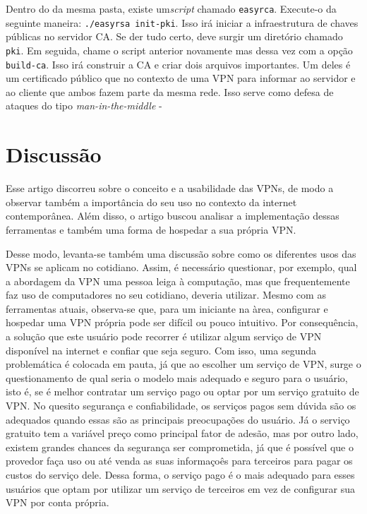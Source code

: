\documentclass[12pt]{article}
\begin{document}
\begin{flushleft}
Dentro do da mesma pasta, existe um\emph{script} chamado \texttt{easyrca}. Execute-o da seguinte
maneira: \texttt{./easyrsa init-pki}. Isso irá iniciar a infraestrutura de chaves públicas no servidor CA.
Se der tudo certo, deve surgir um diretório chamado \texttt{pki}. Em seguida, chame o script anterior 
novamente mas dessa vez com a opção \texttt{build-ca}. Isso irá construir a CA e criar
dois arquivos importantes. Um deles é um certificado público que no contexto de uma VPN para informar
ao servidor e ao cliente que ambos fazem parte da mesma rede. Isso serve como defesa de ataques 
do tipo \emph{man-in-the-middle} 
-

\section{Discussão}

Esse artigo discorreu sobre o conceito e a usabilidade das VPNs, de modo a observar também a importância
do seu uso no contexto da internet contemporânea. Além disso, o artigo buscou analisar a implementação
dessas ferramentas e também uma forma de hospedar a sua própria VPN.

Desse modo, levanta-se também uma discussão sobre como os diferentes usos das VPNs se aplicam no cotidiano.
Assim, é necessário questionar, por exemplo, qual a abordagem da VPN uma pessoa leiga à
computação, mas que frequentemente faz uso de computadores no seu cotidiano, deveria utilizar.
Mesmo com as ferramentas atuais, observa-se que, para um iniciante na àrea, configurar e hospedar
uma VPN própria pode ser difícil ou pouco intuitivo.
Por consequência, a solução que este usuário pode recorrer é utilizar algum serviço de VPN disponível
na internet e confiar que seja seguro. 
Com isso, uma segunda problemática é colocada em pauta, já que ao escolher um serviço de VPN, 
surge o questionamento de qual seria o modelo mais adequado e seguro para o usuário, isto é, se é melhor
contratar um serviço pago ou optar por um serviço gratuito de VPN.
No quesito segurança e confiabilidade, os serviços pagos sem dúvida são os adequados quando essas
são as principais preocupações do usuário.
Já o serviço gratuito tem a variável preço como principal fator de adesão, mas por outro lado, existem
grandes chances da segurança ser comprometida, já que é possível que o provedor faça uso ou até venda
as suas informaçoês para terceiros para pagar os custos do serviço dele.
Dessa forma, o serviço pago é o mais adequado para esses usuários que optam por utilizar um serviço de
terceiros em vez de configurar sua VPN por conta própria. 



\end{flushleft}
\end{document}
